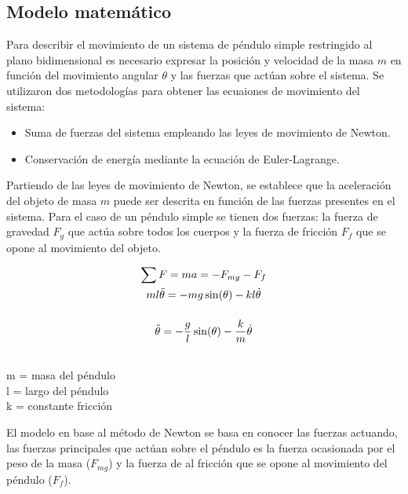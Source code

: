 
\subsection{Modelo matemático}

Para describir el movimiento de un sistema de péndulo simple 
restringido al plano bidimensional es necesario expresar 
la posición y velocidad de la masa $m$ en función del movimiento
angular $\theta$ y las fuerzas que actúan sobre el sistema.
Se utilizaron dos metodologías para obtener las ecuaiones
de movimiento del sistema: 
\begin{itemize}
 \item Suma de fuerzas del sistema empleando las leyes de movimiento de Newton.
 \item Conservación de energía mediante la ecuación de Euler-Lagrange.
\end{itemize}


Partiendo de las leyes de movimiento de Newton, se establece que la aceleración
del objeto de masa $m$ puede ser descrita en función de las fuerzas 
presentes en el sistema. Para el caso de un péndulo simple se tienen dos fuerzas:
la fuerza de gravedad $F_g$ que actúa sobre todos los cuerpos 
y la fuerza de fricción $F_f$ que se opone al movimiento del objeto.

\begin{large}
\begin{gather*}
\sum F = ma = -F_{mg} - F_f \\ \bigskip
ml\ddot{\theta} = -mg\sin(\theta) - kl\dot{\theta} \\ \bigskip
\ddot{\theta} = -\dfrac{g}{l}\sin(\theta) - \dfrac{k}{m}\dot{\theta} \\
\end{gather*} 
\end{large}
\begin{flushright}
\begin{small}
m = masa del péndulo\\
l = largo del péndulo\\
k = constante fricción\\
\end{small}
\end{flushright}

El modelo en base al método de Newton se basa en conocer las fuerzas actuando, las fuerzas principales que actúan sobre el péndulo es la fuerza ocasionada por el peso de la masa ($F_{mg}$) y la fuerza de al fricción que se opone al movimiento del péndulo ($F_f$).\\

